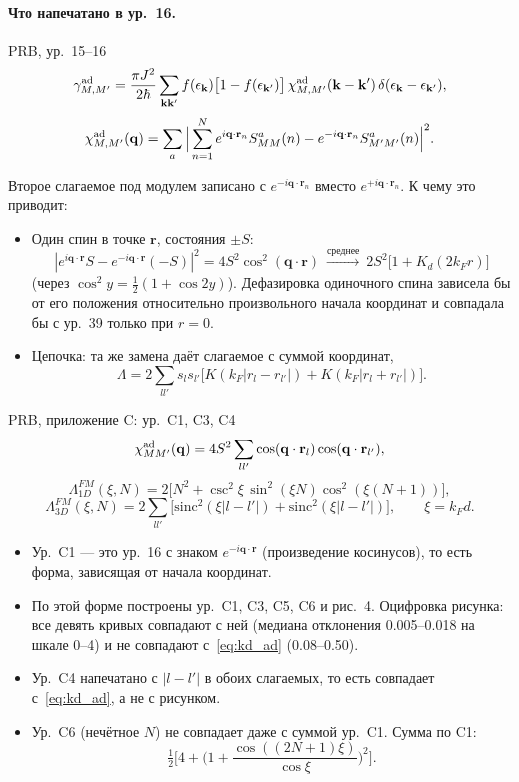 \paragraph{Что напечатано в ур.~16.}
\begin{paperbox}{PRB, ур.~15--16}
\[
\gamma^{\rm ad}_{M,M'}=\frac{\pi J^2}{2\hbar}\sum_{\mathbf k\mathbf k'}f(\epsilon_{\mathbf k})\big[1-f(\epsilon_{\mathbf k'})\big]\,
\chi^{\rm ad}_{M,M'}(\mathbf k-\mathbf k')\,\delta(\epsilon_{\mathbf k}-\epsilon_{\mathbf k'}),
\]
\[
\chi^{\rm ad}_{M,M'}(\mathbf q)=\sum_a\Big|\sum_{n=1}^{N}e^{i\mathbf q\cdot\mathbf r_n}S^a_{MM}(n)-e^{-i\mathbf q\cdot\mathbf r_n}S^a_{M'M'}(n)\Big|^2 .
\]
\end{paperbox}
Второе слагаемое под модулем записано с $e^{-i\mathbf q\cdot\mathbf r_n}$ вместо $e^{+i\mathbf q\cdot\mathbf r_n}$. К
чему это приводит:
\begin{itemize}
\item Один спин в точке $\mathbf r$, состояния $\pm S$:
  \[
  |e^{i\mathbf q\cdot\mathbf r}S-e^{-i\mathbf q\cdot\mathbf r}(-S)|^2=4S^2\cos^2(\mathbf q\cdot\mathbf r)
  \ \xrightarrow{\text{среднее}}\ 2S^2\big[1+K_d(2k_Fr)\big]
  \]
  (через $\cos^2y=\tfrac12(1+\cos2y)$). Дефазировка одиночного спина зависела бы от
  его положения относительно произвольного начала координат и совпадала
  бы с ур.~39 только при $r=0$.
\item Цепочка: та же замена даёт слагаемое с суммой координат,
  \[
  \Lambda=2\sum_{ll'}s_ls_{l'}\big[K(k_F|r_l-r_{l'}|)+K(k_F|r_l+r_{l'}|)\big].
  \]
\end{itemize}
\begin{paperbox}{PRB, приложение C: ур.~C1, C3, C4}
\[
\chi^{\rm ad}_{MM'}(\mathbf q)=4S^2\sum_{ll'}\cos(\mathbf q\cdot\mathbf r_l)\cos(\mathbf q\cdot\mathbf r_{l'}),
\]
\[
\Lambda^{FM}_{1D}(\xi,N)=2\big[N^2+\csc^2\xi\,\sin^2(\xi N)\cos^2(\xi(N+1))\big],
\]
\[
\Lambda^{FM}_{3D}(\xi,N)=2\sum_{ll'}\big[\mathrm{sinc}^2(\xi|l-l'|)+\mathrm{sinc}^2(\xi|l-l'|)\big],\qquad \xi=k_Fd .
\]
\end{paperbox}
\begin{cmpbox}
\begin{itemize}
\item Ур.~C1 --- это ур.~16 с знаком $e^{-i\mathbf q\cdot\mathbf r}$ (произведение косинусов), то есть
  форма, зависящая от начала координат.
\item По этой форме построены ур.~C1, C3, C5, C6 и рис.~4. Оцифровка
  рисунка: все девять кривых совпадают с ней (медиана отклонения
  0.005--0.018 на шкале 0--4) и не совпадают с~\eqref{eq:kd_ad} (0.08--0.50).
\item Ур.~C4 напечатано с $|l-l'|$ в обоих слагаемых, то есть совпадает
  с~\eqref{eq:kd_ad}, а не с рисунком.
\item Ур.~C6 (нечётное $N$) не совпадает даже с суммой ур.~C1. Сумма по C1:
  \[
  \tfrac12\Big[4+\Big(1+\frac{\cos((2N+1)\xi)}{\cos\xi}\Big)^2\Big].
  \]
\end{itemize}
\end{cmpbox}

